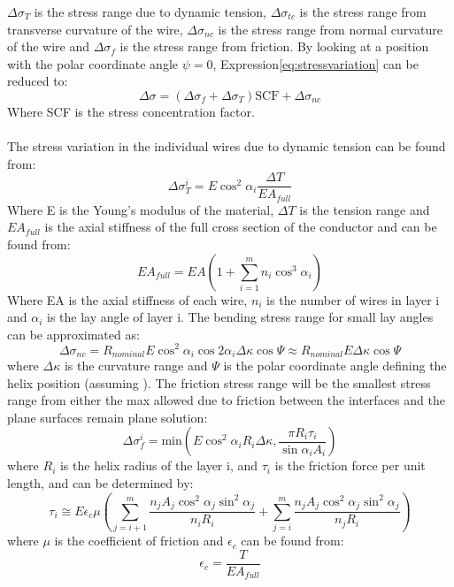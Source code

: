 \noindentWhere $\Delta \sigma_T$ is the stress range due to dynamic tension, $\Delta \sigma_{tc}$ is the stress range from transverse curvature of the wire, $\Delta \sigma_{nc}$ is the stress range from normal curvature of the wire and $\Delta \sigma_{f}$ is the stress range from friction. By looking at a position with the polar coordinate angle $\psi = 0$, Expression\ref{eq:stressvariation} can be reduced to:
\begin{equation}
    \Delta \sigma = (\Delta \sigma_f + \Delta \sigma_{T})\text{SCF} + \Delta \sigma_{nc}
    \label{eq:stressvariationred}
\end{equation}Where SCF is the stress concentration factor. \\\\The stress variation in the individual wires due to dynamic tension can be found from:
\begin{equation}
    \Delta \sigma_T^i = E \cos^2 \alpha_i \frac{\Delta T}{E A_{full}} 
    \label{eq:sigmaT}
\end{equation}
\noindent Where E is the Young's modulus of the material, $\Delta T$ is the tension range and $EA_{full}$  is the axial stiffness of the full cross section of the conductor and can be found from:
\begin{equation}
    EA_{full}=EA \left( 1+\sum_{i=1}^m n_i \cos^3\alpha_i \right)
\end{equation}
\noindent Where EA is the axial stiffness of each wire, $n_i$ is the number of wires in layer i and $\alpha_i$ is the lay angle of layer i. \newline
\newline
The bending stress range for small lay angles can be approximated as:
\begin{equation}
    \Delta \sigma_{nc} = R_{nominal} E \cos^2 \alpha_i \cos2 \alpha_i \Delta \kappa \cos \Psi \approx R_{nominal}E \Delta \kappa \cos \Psi
\end{equation}
where $\Delta \kappa$ is the curvature range and $\Psi$ is the polar coordinate angle defining the helix position (assuming ). \newline
\newline
The friction stress range will be the smallest stress range from either the max allowed due to friction between the interfaces and the plane surfaces remain plane solution:
\begin{equation}
    \Delta \sigma_f^i =\text{min}\left(E \cos^2 \alpha_i R_i \Delta \kappa , \frac{\pi R_i \tau_i}{\sin \alpha_i A_i}\right)
\end{equation}
where $R_i$ is the helix radius of the layer i, and $\tau_i$ is the friction force per unit length, and can be determined by:
\begin{equation}
    \tau_i \cong E \epsilon_c \mu \left( \sum_{j=i+1}^m \frac{n_j A_j \cos^2 \alpha_j \sin^2 \alpha_j }{n_i R_i} + \sum_{j=i}^m \frac{n_j A_j \cos^2 \alpha_j  \sin^2 \alpha_j}{n_j R_i}\right)
\end{equation}
where $\mu$ is the coefficient of friction and $\epsilon_c$ can be found from:
\begin{equation}
    \epsilon_c =\frac{T}{EA_{full}}
    \label{eq:stressvariation2}
\end{equation}